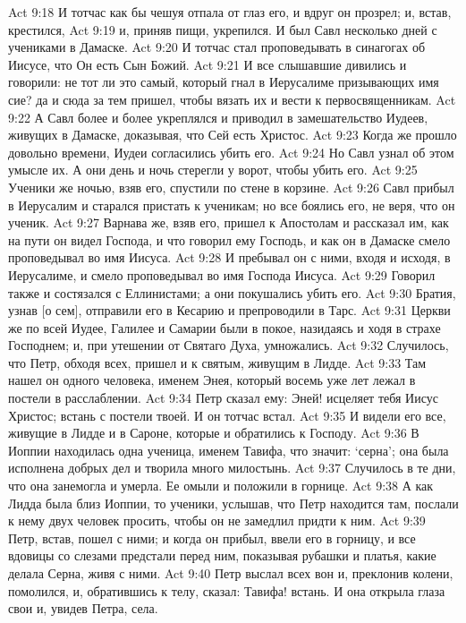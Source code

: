 Act 9:18  И тотчас как бы чешуя отпала от глаз его, и вдруг он прозрел; и, встав, крестился,
Act 9:19  и, приняв пищи, укрепился. И был Савл несколько дней с учениками в Дамаске.
Act 9:20  И тотчас стал проповедывать в синагогах об Иисусе, что Он есть Сын Божий.
Act 9:21  И все слышавшие дивились и говорили: не тот ли это самый, который гнал в Иерусалиме призывающих имя сие? да и сюда за тем пришел, чтобы вязать их и вести к первосвященникам.
Act 9:22  А Савл более и более укреплялся и приводил в замешательство Иудеев, живущих в Дамаске, доказывая, что Сей есть Христос.
Act 9:23  Когда же прошло довольно времени, Иудеи согласились убить его.
Act 9:24  Но Савл узнал об этом умысле их. А они день и ночь стерегли у ворот, чтобы убить его.
Act 9:25  Ученики же ночью, взяв его, спустили по стене в корзине.
Act 9:26  Савл прибыл в Иерусалим и старался пристать к ученикам; но все боялись его, не веря, что он ученик.
Act 9:27  Варнава же, взяв его, пришел к Апостолам и рассказал им, как на пути он видел Господа, и что говорил ему Господь, и как он в Дамаске смело проповедывал во имя Иисуса.
Act 9:28  И пребывал он с ними, входя и исходя, в Иерусалиме, и смело проповедывал во имя Господа Иисуса.
Act 9:29  Говорил также и состязался с Еллинистами; а они покушались убить его.
Act 9:30  Братия, узнав [о сем], отправили его в Кесарию и препроводили в Тарс.
Act 9:31  Церкви же по всей Иудее, Галилее и Самарии были в покое, назидаясь и ходя в страхе Господнем; и, при утешении от Святаго Духа, умножались.
Act 9:32  Случилось, что Петр, обходя всех, пришел и к святым, живущим в Лидде.
Act 9:33  Там нашел он одного человека, именем Энея, который восемь уже лет лежал в постели в расслаблении.
Act 9:34  Петр сказал ему: Эней! исцеляет тебя Иисус Христос; встань с постели твоей. И он тотчас встал.
Act 9:35  И видели его все, живущие в Лидде и в Сароне, которые и обратились к Господу.
Act 9:36  В Иоппии находилась одна ученица, именем Тавифа, что значит: `серна'; она была исполнена добрых дел и творила много милостынь.
Act 9:37  Случилось в те дни, что она занемогла и умерла. Ее омыли и положили в горнице.
Act 9:38  А как Лидда была близ Иоппии, то ученики, услышав, что Петр находится там, послали к нему двух человек просить, чтобы он не замедлил придти к ним.
Act 9:39  Петр, встав, пошел с ними; и когда он прибыл, ввели его в горницу, и все вдовицы со слезами предстали перед ним, показывая рубашки и платья, какие делала Серна, живя с ними.
Act 9:40  Петр выслал всех вон и, преклонив колени, помолился, и, обратившись к телу, сказал: Тавифа! встань. И она открыла глаза свои и, увидев Петра, села.
